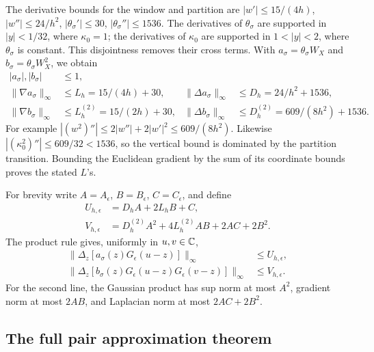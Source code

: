 The derivative bounds for the window and partition are
$|w'|\le15/(4h)$, $|w''|\le24/h^2$,
$|\theta_\sigma'|\le30$, $|\theta_\sigma''|\le1536$.
The derivatives of $\theta_\sigma$ are supported in $|y|<1/32$,
where $\kappa_0=1$; the derivatives of $\kappa_0$ are supported in
$1<|y|<2$, where $\theta_\sigma$ is constant. This disjointness
removes their cross terms. With
$a_\sigma=\theta_\sigma W_X$ and
$b_\sigma=\theta_\sigma W_X^2$, we obtain
\begin{equation}\label{eq:window-costs}
 \begin{aligned}
 |a_\sigma|,|b_\sigma|&\le1,\\
 \|\nabla a_\sigma\|_\infty&\le L_h=15/(4h)+30,&
 \|\Delta a_\sigma\|_\infty&\le D_h=24/h^2+1536,\\
 \|\nabla b_\sigma\|_\infty&\le L_h^{(2)}=15/(2h)+30,&
 \|\Delta b_\sigma\|_\infty&\le D_h^{(2)}=609/(8h^2)+1536.
 \end{aligned}
\end{equation}
For example $|(w^2)''|\le2|w''|+2|w'|^2\le609/(8h^2)$.
Likewise $|(\kappa_0^2)''|\le609/32<1536$, so the vertical
bound is dominated by the partition transition. Bounding the Euclidean
gradient by the sum of its coordinate bounds proves the stated $L$'s.

For brevity write $A=A_\epsilon$, $B=B_\epsilon$, $C=C_\epsilon$,
and define
\begin{equation}\label{eq:UV-costs}
 \begin{split}
 U_{h,\epsilon}&=D_hA+2L_hB+C,\\
 V_{h,\epsilon}&=D_h^{(2)}A^2+4L_h^{(2)}AB+2AC+2B^2.
 \end{split}
\end{equation}
The product rule gives, uniformly in $u,v\in\mathbb C$,
\begin{align}
 \|\Delta_z[a_\sigma(z)G_\epsilon(u-z)]\|_\infty
       &\le U_{h,\epsilon},\label{eq:single-test-cost}\\
 \|\Delta_z[b_\sigma(z)G_\epsilon(u-z)G_\epsilon(v-z)]\|_\infty
       &\le V_{h,\epsilon}.\label{eq:self-test-cost}
\end{align}
For the second line, the Gaussian product has sup norm at most $A^2$,
gradient norm at most $2AB$, and Laplacian norm at most $2AC+2B^2$.

\subsection{The full pair approximation theorem}

